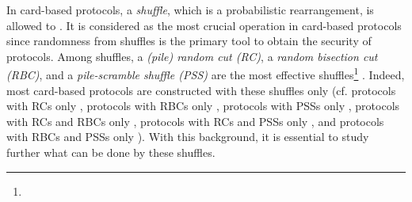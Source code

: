 In card-based protocols, a \emph{shuffle}, which is a probabilistic rearrangement, is allowed to . 
It is considered as the most crucial operation in card-based protocols since randomness from shuffles is the primary tool to obtain the security of protocols. 
Among shuffles, a \emph{(pile) random cut (RC)}, a \emph{random bisection cut (RBC)}, and a \emph{pile-scramble shuffle (PSS)} are the most effective shuffles\footnote{} . 
Indeed, most card-based protocols are constructed with these shuffles only (cf. protocols with RCs only \cite{Boer89, Kilian93, Niemi98, Niemi99, Stiglic01, Uchiike06, Heather14, MiyaharaCOCOA18, ShinagawaICISC18, ToyodaAPKC20, SaitoTPNC20, MiyaharaTCS20, KoyamaAPKC21, RobertCiE21, AbeNGC21, KochFUN21}, protocols with RBCs only \cite{MizukiFAW09, MizukiAC12, MizukiUCNC13, NishidaTPNC13, NishidaTAMC15, NishidaIEICE15, MizukiCANS16, ShinagawaFAW19,RuangwisesTCS21}, protocols with PSSs only \cite{GradwohlFUN07, PascalFUN16, SasakiFUN18, Koch18b, RobertSSS20, SasakiTCS20, ShinagawaDAM21, MurataWALCOM21,RuangwisesNGC21}, protocols with RCs and RBCs only \cite{AbeAPKC18, TakashimaTPNC19, KoyamaCSR21, MiyaharaFUN21}, protocols with RCs and PSSs only \cite{ShinagawaSSS18, TakashimaCOCOA19, DumasCOCOON19, MiyaharaISPEC19, TakashimaTCS20, RuangwisesTCS21a}, and protocols with RBCs and PSSs only \cite{IshikawaUCNC15, MizukiTCS16, HashimotoICITS17, ShinodaSecITC20}). 
With this background, it is essential to study further what can be done by these shuffles. 


